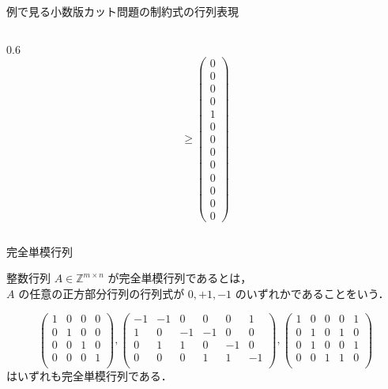 \documentclass[aspectratio=169]{beamer}
\begin{document}
\begin{frame}{例で見る小数版カット問題の制約式の行列表現}
\begin{example}[小数版カット問題の制約式]
{\begin{columns}
\begin{column}{0.6\textwidth}
{\[							\geq
							\begin{pmatrix}
								0 \\ 0 \\ 0 \\ 0 \\ 1 \\ 0 \\ 0 \\ 0 \\ 0 \\ 0 \\ 0 \\ 0 \\ 0
							\end{pmatrix}
						\]
					}
				\end{column}
			\end{columns}

		}
	\end{example}
\end{frame}

\begin{frame}{完全単模行列}
	\begin{definition}[完全単模行列]
		整数行列 \(A \in \mathbb{Z}^{m \times n}\) が\alert{完全単模行列}であるとは，\\
		\(A\) の任意の正方部分行列の行列式が \(0, +1, -1\) のいずれかであることをいう．
	\end{definition}

	\begin{example}[完全単模行列]
		\[
			\begin{pmatrix}
				1 & 0 & 0 & 0 \\
				0 & 1 & 0 & 0 \\
				0 & 0 & 1 & 0 \\
				0 & 0 & 0 & 1 \\
			\end{pmatrix},
			\begin{pmatrix}
				-1 & -1 & 0  & 0  & 0  & 1  \\
				1  & 0  & -1 & -1 & 0  & 0  \\
				0  & 1  & 1  & 0  & -1 & 0  \\
				0  & 0  & 0  & 1  & 1  & -1 \\
			\end{pmatrix},
			\begin{pmatrix}
				1 & 0 & 0 & 0 & 1 \\
				0 & 1 & 0 & 1 & 0 \\
				0 & 1 & 0 & 0 & 1 \\
				0 & 0 & 1 & 1 & 0 \\
			\end{pmatrix}
		\] はいずれも\alert{完全単模行列}である．
	\end{example}
\end{frame}
\end{document}
